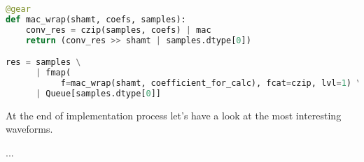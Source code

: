 \documentclass[a4paper, 12pt]{article}
\begin{document}
\begin{lstlisting}[language=Python, caption=Instance of SDP]
@gear
def mac_wrap(shamt, coefs, samples):
    conv_res = czip(samples, coefs) | mac
    return (conv_res >> shamt | samples.dtype[0])

res = samples \
      | fmap(
           f=mac_wrap(shamt, coefficient_for_calc), fcat=czip, lvl=1) \
      | Queue[samples.dtype[0]]
\end{lstlisting}

At the end of implementation process let's have a look at the most interesting waveforms.

...
\end{document}
